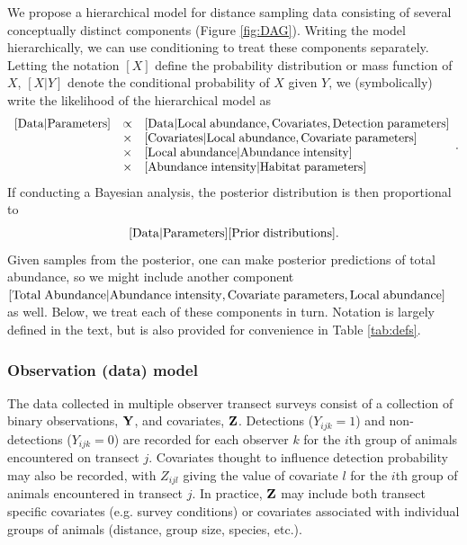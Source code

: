 \documentclass[10pt]{article}
\begin{document}
We propose a hierarchical model for distance sampling data consisting of several conceptually distinct components (Figure \ref{fig:DAG}).  Writing the model hierarchically, we can use conditioning to treat these components separately.  Letting the notation $[X]$ define the probability distribution or mass function of $X$, $[X|Y]$ denote the conditional probability of $X$ given $Y$, we (symbolically) write the likelihood of the hierarchical model as
$$
\begin{array}{lll}
[ {\rm Data} | {\rm Parameters}] & \propto & [{\rm Data | Local \hspace{1mm} abundance, Covariates, Detection \hspace{1mm} parameters}]\\
& \times & [{\rm Covariates|Local \hspace{1mm} abundance, Covariate \hspace{1mm} parameters}]\\
& \times & [{\rm Local \hspace{1mm} abundance | Abundance \hspace{1mm} intensity }]\\
& \times & [{\rm Abundance \hspace{1mm} intensity | Habitat  \hspace{1mm}  parameters}]
\end{array}.
$$
If conducting a Bayesian analysis, the posterior distribution is then proportional to
$$[ {\rm Data} | {\rm Parameters}][{\rm Prior \hspace{1mm} distributions}].
$$  Given samples from the posterior, one can make posterior predictions of total abundance, so we might include another component
$[{\rm Total \hspace{1mm} Abundance |Abundance \hspace{1mm} intensity,Covariate \hspace{1mm} parameters,Local \hspace{1mm} abundance }]$ as well.  Below, we treat each of these components in turn.  Notation is largely defined in the text, but is also provided for convenience in Table \ref{tab:defs}.

\subsubsection*{Observation (data) model}

The data collected in multiple observer transect surveys consist of a collection of binary observations, ${\bf Y}$, and covariates, ${\bf Z}$.  Detections ($Y_{ijk}=1$) and non-detections ($Y_{ijk}=0$) are recorded for each observer $k$ for the $i$th group of animals encountered on transect $j$.  Covariates thought to influence detection probability may also be recorded, with $Z_{ijl}$ giving the value of covariate $l$ for the $i$th group of animals encountered in transect $j$.  In practice, ${\bf Z}$ may include both transect specific covariates (e.g. survey conditions) or covariates associated with individual groups of animals (distance, group size, species, etc.).
\end{document}
